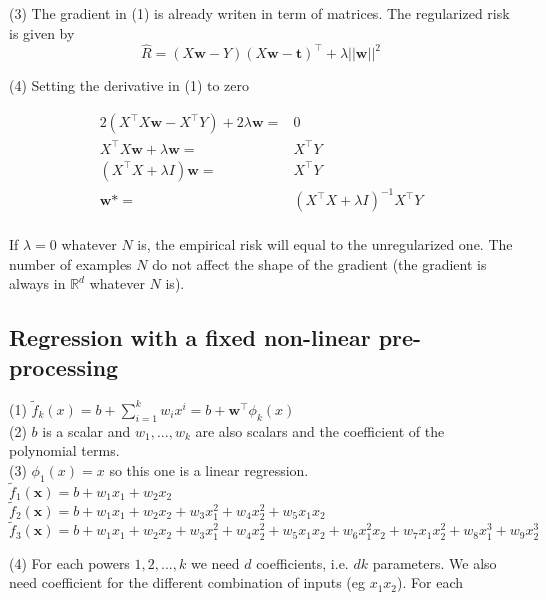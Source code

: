 \documentclass[11pt,english]{article}
\newcommand{\real}{\mathbb{R}}
\begin{document}
    (3) The gradient in (1) is already writen in term of matrices. The regularized risk is given by
    $$
        \hat{R} = (X\bm{w}-Y)(X\bm{w}-\bm{t})^\top + \lambda ||\bm{w}||^2
    $$
    
    (4) Setting the derivative in (1) to zero
        
    \begin{equation}
        \begin{split}
            2(X^\top X\bm{w} - X^\top Y) + 2 \lambda \bm{w} =& 0 \\
            X^\top X\bm{w} + \lambda \bm{w} =& X^\top Y \\
            (X^\top X+ \lambda I) \bm{w} =& X^\top Y \\
             \bm{w}* =& (X^\top X+ \lambda I)^{-1}X^\top Y \\
        \end{split}
    \end{equation}

    If $\lambda=0$ whatever $N$ is, the empirical risk will equal to the unregularized one. The number of examples $N$ do not affect the shape of the gradient (the gradient is always in $\real^d$ whatever $N$ is).

    \subsection{Regression with a fixed non-linear pre-processing}

    (1) $\tilde{f}_k (x)=b + \sum_{i=1}^k w_i x^i = b + \bm{w}^\top \phi_k(x)$\\

    (2) $b$ is a scalar and $w_1,...,w_k$ are also scalars and the coefficient of the polynomial terms.\\
    
    (3) $\phi_1(x)=x$ so this one is a linear regression. \\

    $\tilde{f}_1 (\bm{x})=b + w_1 x_1 + w_2 x_2$\\

    $\tilde{f}_2 (\bm{x})=b + w_1 x_1 + w_2 x_2 + w_3 x_1^2 + w_4 x_2^2 + w_5 x_1 x_2$\\

    $\tilde{f}_3 (\bm{x})=b + w_1 x_1 + w_2 x_2 + w_3 x_1^2 + w_4 x_2^2 + w_5 x_1 x_2 + w_6 x_1^2x_2 + w_7 x_1x_2^2 + w_8x_1^3 + w_9x_2^3$

    (4) For each powers $1,2,...,k$ we need $d$ coefficients, i.e. $dk$ parameters. We also need coefficient for the different combination of inputs (eg $x_1x_2$). For each 
\end{document}
